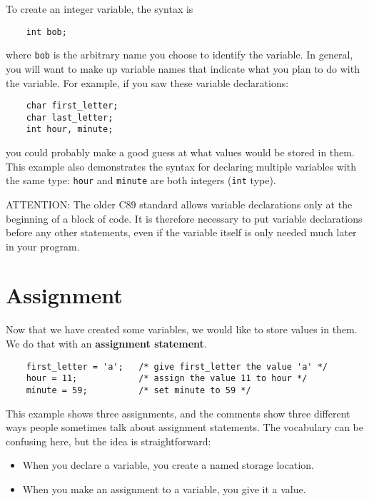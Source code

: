 
To create an integer variable, the syntax is 

\begin{verbatim}
    int bob;
\end{verbatim}
%
where {\tt bob} is the arbitrary name you choose to identify the
variable.  In general, you will want to make up variable names
that indicate what you plan to do with the variable.  For
example, if you saw these variable declarations:

\begin{verbatim}
    char first_letter;
    char last_letter;
    int hour, minute;
\end{verbatim}
%
you could probably make a good guess at what values
would be stored in them.  This example
also demonstrates the syntax for declaring multiple variables
with the same type: {\tt hour} and {\tt minute}
are both integers ({\tt int} type).

ATTENTION: The older C89 standard allows variable declarations
only at the beginning of a block of code. It is therefore necessary
to put variable declarations before any other statements,
even if the variable itself is only needed much later in your program.

\section{Assignment}

Now that we have created some variables, we would like to
store values in them.  We do that with an {\bf assignment
statement}.

\begin{verbatim}
    first_letter = 'a';   /* give first_letter the value 'a' */
    hour = 11;            /* assign the value 11 to hour */
    minute = 59;          /* set minute to 59 */
\end{verbatim}
%
This example shows three assignments, and the comments show
three different ways people sometimes talk about assignment
statements.  The vocabulary can be confusing here, but the
idea is straightforward:

\begin{itemize}

\item When you declare a variable, you create a named storage location.

\item When you make an assignment to a variable, you give it a value.

\end{itemize}

